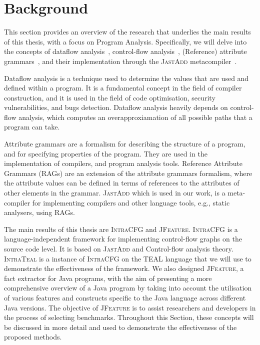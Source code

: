 \section{Background}
\label{sec:background}
This section provides an overview of the research that underlies the main results 
of this thesis, with a focus on Program Analysis. Specifically, we will delve into
the concepts of dataflow analysis~\cite{aho2007compilers,Nielson2010Principles},
control-flow analysis~\cite{allen1970control}, (Reference) attribute grammars~\cite{knuth1968semantics, DBLP:journals/informaticaSI/Hedin00},
and their implementation through the \textsc{JastAdd} metacompiler~\cite{DBLP:journals/entcs/HedinM01}.

Dataflow analysis is a technique used to determine the values that are used and
defined within a program. It is a fundamental concept in the field of compiler
construction, and it is used in the field of code optimisation, security vulnerabilities, and bugs detection.
Dataflow analysis heavily depends on control-flow analysis, which computes an overapproxiamation of
all possible paths that a program can take.

Attribute grammars are a formalism for describing the structure of a program,
and for specifying properties of the program. They are used in the implementation
of compilers, and program analysis tools.
Reference Attribute Grammars (RAGs) are an extension of the attribute grammars formalism,
where the attribute values can be defined in terms of references to the attributes
of other elements in the grammar. \textsc{JastAdd} which is used in our work, is a meta-compiler
for implementing compilers and other language tools, e.g., static analysers, using RAGs.

The main results of this thesis are \textsc{IntraCFG} and \textsc{JFeature}.
\textsc{IntraCFG} is a language-independent framework for implementing control-flow graphs
on the source code level.
It is based on \textsc{JastAdd} and Control-flow analysis theory. \textsc{IntraTeal} is a instance
of \textsc{IntraCFG} on the TEAL language that we will use to demonstrate the effectiveness
of the framework. We also designed \textsc{JFeature}, a fact extractor for Java programs,
with the aim of presenting a more comprehensive overview of a Java program by
taking into account the utilisation of various features and constructs specific
to the Java language across different Java versions. The objective of \textsc{JFeature} is
to assist researchers and developers in the process of selecting benchmarks.
Throughout this Section, these concepts will be discussed in more detail and used to
demonstrate the effectiveness of the proposed methods.

